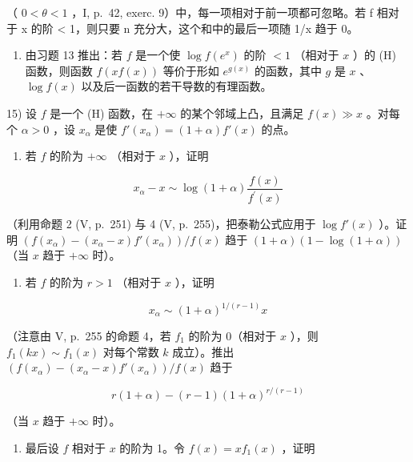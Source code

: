 （ \(0 < \theta < 1\) ，I, p.~42, exerc. 9）中，每一项相对于前一项都可忽略。若 f 相对于 x 的阶 \textless{} 1，则只要 n 充分大，这个和中的最后一项随 1/x 趋于 0。

\begin{enumerate}
\def\labelenumi{\arabic{enumi})}
\setcounter{enumi}{13}
\tightlist
\item
  由习题 13 推出：若 \(f\) 是一个使 \(\log f(e^x)\) 的阶 \(< 1\) （相对于 \(x\) ）的 (H) 函数，则函数 \(f(xf(x))\) 等价于形如 \(e^{g(x)}\) 的函数，其中 \(g\) 是 \(x\) 、 \(\log f(x)\) 以及后一函数的若干导数的有理函数。
\end{enumerate}

15) 设 \(f\) 是一个 (H) 函数，在 \(+\infty\) 的某个邻域上凸，且满足 \(f(x) \gg x\) 。对每个 \(\alpha > 0\) ，设 \(x_{\alpha}\) 是使 \(f'(x_{\alpha}) = (1 + \alpha)f'(x)\) 的点。

\begin{enumerate}
\def\labelenumi{\alph{enumi})}
\tightlist
\item
  若 \(f\) 的阶为 \(+\infty\) （相对于 \(x\) ），证明
\end{enumerate}

\[
x _ {\alpha} - x \sim \log (1 + \alpha) \frac {f (x)}{f ^ {\prime} (x)}
\]

（利用命题 2 (V, p.~251) 与 4 (V, p.~255)，把泰勒公式应用于 \(\log f'(x)\) ）。证明 \(\left(f(x_{\alpha}) - (x_{\alpha} - x)f'(x_{\alpha})\right)/f(x)\) 趋于 \((1 + \alpha)\left(1 - \log(1 + \alpha)\right)\) （当 \(x\) 趋于 \(+\infty\) 时）。

\begin{enumerate}
\def\labelenumi{\alph{enumi})}
\setcounter{enumi}{1}
\tightlist
\item
  若 \(f\) 的阶为 \(r > 1\) （相对于 \(x\) ），证明
\end{enumerate}

\[
x _ {\alpha} \sim (1 + \alpha) ^ {1 / (r - 1)} x
\]

（注意由 V, p.~255 的命题 4，若 \(f_{1}\) 的阶为 0（相对于 \(x\) ），则 \(f_{1}(kx) \sim f_{1}(x)\) 对每个常数 \(k\) 成立）。推出 \(\left(f(x_{\alpha}) - (x_{\alpha} - x)f'(x_{\alpha})\right) / f(x)\) 趋于

\[
r (1 + \alpha) - (r - 1) (1 + \alpha) ^ {r / (r - 1)}
\]

（当 \(x\) 趋于 \(+\infty\) 时）。

\begin{enumerate}
\def\labelenumi{\alph{enumi})}
\setcounter{enumi}{2}
\tightlist
\item
  最后设 \(f\) 相对于 \(x\) 的阶为 1。令 \(f(x) = xf_1(x)\) ，证明
\end{enumerate}

